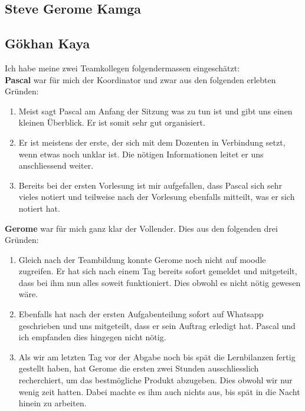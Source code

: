 \subsection*{Steve Gerome Kamga}

\subsection*{Gökhan Kaya}

Ich habe meine zwei Teamkollegen folgendermassen eingeschätzt:\\

\textbf{Pascal} war für mich der Koordinator und zwar aus den folgenden erlebten Gründen:
\begin{enumerate} 
\item{Meist sagt Pascal am Anfang der Sitzung was zu tun ist und gibt uns einen kleinen Überblick. Er ist somit sehr gut organisiert.}
\item{Er ist meistens der erste, der sich mit dem Dozenten in Verbindung setzt, wenn etwas noch unklar ist. Die nötigen Informationen leitet er uns anschliessend weiter.}
\item{Bereits bei der ersten Vorlesung ist mir aufgefallen, dass Pascal sich sehr vieles notiert und teilweise nach der Vorlesung ebenfalls mitteilt, was er sich notiert hat.}
\end{enumerate}

\textbf{Gerome} war für mich ganz klar der Vollender. Dies aus den folgenden drei Gründen:
\begin{enumerate} 
\item{Gleich nach der Teambildung konnte Gerome noch nicht auf moodle zugreifen. Er hat sich nach einem Tag bereits sofort gemeldet und mitgeteilt, dass bei ihm nun alles soweit funktioniert. Dies obwohl es nicht nötig gewesen wäre.}
\item{Ebenfalls hat nach der ersten Aufgabenteilung sofort auf Whatsapp geschrieben und uns mitgeteilt, dass er sein Auftrag erledigt hat. Pascal und ich empfanden dies hingegen nicht nötig.}
\item{Als wir am letzten Tag vor der Abgabe noch bis spät die Lernbilanzen fertig gestellt haben, hat Gerome die ersten zwei Stunden ausschliesslich recherchiert, um das bestmögliche Produkt abzugeben. Dies obwohl wir nur wenig zeit hatten. Dabei machte es ihm auch nichts aus, bis spät in die Nacht hinein zu arbeiten.}
\end{enumerate}
